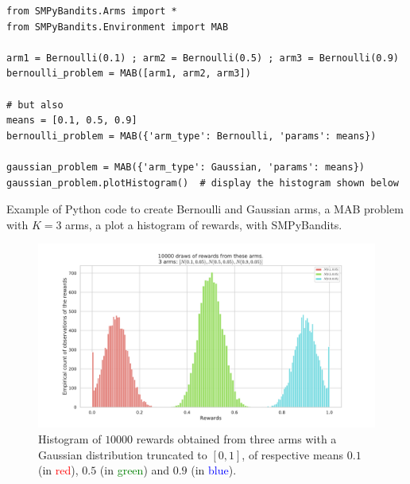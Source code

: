 \begin{small}
\begin{listing}[h!]
    \begin{verbatim}
from SMPyBandits.Arms import *
from SMPyBandits.Environment import MAB

arm1 = Bernoulli(0.1) ; arm2 = Bernoulli(0.5) ; arm3 = Bernoulli(0.9)
bernoulli_problem = MAB([arm1, arm2, arm3])

# but also
means = [0.1, 0.5, 0.9]
bernoulli_problem = MAB({'arm_type': Bernoulli, 'params': means})

gaussian_problem = MAB({'arm_type': Gaussian, 'params': means})
gaussian_problem.plotHistogram()  # display the histogram shown below
    \end{verbatim}
    \caption{Example of Python code to create Bernoulli and Gaussian arms, a MAB problem with $K=3$ arms, a plot a histogram of rewards, with SMPyBandits.}
    \label{lst:3:pythonCodeCreateProblem}
\end{listing}
\end{small}

\begin{figure}[h!]  %
	\centering
	\includegraphics[width=0.82\linewidth]{exampleOfRewards.pdf}
	\caption[Histogram of $10000$ \iid{} rewards obtained from three arms with a truncated Gaussian distribution, of respective means $0.1$, $0.5$ and $0.9$.]{Histogram of $10000$ \iid{} rewards obtained from three arms with a Gaussian distribution truncated to $[0,1]$, of respective means $0.1$ (in \textcolor{red}{red}), $0.5$ (in \textcolor{green}{green}) and $0.9$ (in \textcolor{blue}{blue}).}
	\label{fig:3:exampleOfRewards}
\end{figure}

